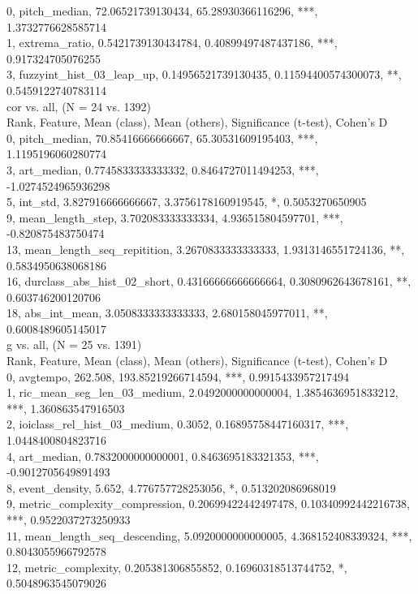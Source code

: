 0, pitch_median, 72.06521739130434, 65.28930366116296, ***, 1.3732776628585714\\
1, extrema_ratio, 0.5421739130434784, 0.40899497487437186, ***, 0.917324705076255\\
3, fuzzyint_hist_03_leap_up, 0.14956521739130435, 0.11594400574300073, **, 0.5459122740783114\\
cor vs. all, (N = 24 vs. 1392)\\
Rank, Feature, Mean (class), Mean (others), Significance (t-test), Cohen's D\\
0, pitch_median, 70.85416666666667, 65.30531609195403, ***, 1.1195196060280774\\
3, art_median, 0.7745833333333332, 0.8464727011494253, ***, -1.0274524965936298\\
5, int_std, 3.827916666666667, 3.3756178160919545, *, 0.5053270650905\\
9, mean_length_step, 3.702083333333334, 4.936515804597701, ***, -0.820875483750474\\
13, mean_length_seq_repitition, 3.2670833333333333, 1.9313146551724136, **, 0.5834950638068186\\
16, durclass_abs_hist_02_short, 0.43166666666666664, 0.3080962643678161, **, 0.603746200120706\\
18, abs_int_mean, 3.0508333333333333, 2.680158045977011, **, 0.6008489605145017\\
g vs. all, (N = 25 vs. 1391)\\
Rank, Feature, Mean (class), Mean (others), Significance (t-test), Cohen's D\\
0, avgtempo, 262.508, 193.85219266714594, ***, 0.9915433957217494\\
1, ric_mean_seg_len_03_medium, 2.0492000000000004, 1.3854636951833212, ***, 1.360863547916503\\
2, ioiclass_rel_hist_03_medium, 0.3052, 0.16895758447160317, ***, 1.0448400804823716\\
4, art_median, 0.7832000000000001, 0.8463695183321353, ***, -0.9012705649891493\\
8, event_density, 5.652, 4.776757728253056, *, 0.513202086968019\\
9, metric_complexity_compression, 0.20699422442497478, 0.10340992442216738, ***, 0.9522037273250933\\
11, mean_length_seq_descending, 5.0920000000000005, 4.368152408339324, ***, 0.8043055966792578\\
12, metric_complexity, 0.205381306855852, 0.16960318513744752, *, 0.5048963545079026\\
